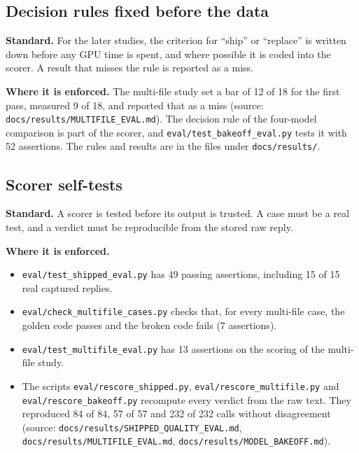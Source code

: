 \subsection{Decision rules fixed before the data}

\textbf{Standard.} For the later studies, the criterion for ``ship'' or ``replace'' is written down before any GPU time is spent, and where possible it is coded into the scorer. A result that misses the rule is reported as a miss.

\textbf{Where it is enforced.} The multi-file study set a bar of 12 of 18 for the first pass, measured 9 of 18, and reported that as a miss (source: \texttt{docs/\allowbreak{}results/\allowbreak{}MULTIFILE\_\allowbreak{}EVAL.md}). The decision rule of the four-model comparison is part of the scorer, and \texttt{eval/\allowbreak{}test\_\allowbreak{}bakeoff\_\allowbreak{}eval.py} tests it with 52 assertions. The rules and results are in the files under \texttt{docs/\allowbreak{}results/\allowbreak{}}.

\subsection{Scorer self-tests}

\textbf{Standard.} A scorer is tested before its output is trusted. A case must be a real test, and a verdict must be reproducible from the stored raw reply.

\textbf{Where it is enforced.}
\begin{itemize}
  \item \texttt{eval/\allowbreak{}test\_\allowbreak{}shipped\_\allowbreak{}eval.py} has 49 passing assertions, including 15 of 15 real captured replies.
  \item \texttt{eval/\allowbreak{}check\_\allowbreak{}multifile\_\allowbreak{}cases.py} checks that, for every multi-file case, the golden code passes and the broken code fails (7 assertions).
  \item \texttt{eval/\allowbreak{}test\_\allowbreak{}multifile\_\allowbreak{}eval.py} has 13 assertions on the scoring of the multi-file study.
  \item The scripts \texttt{eval/\allowbreak{}rescore\_\allowbreak{}shipped.py}, \texttt{eval/\allowbreak{}rescore\_\allowbreak{}multifile.py} and \texttt{eval/\allowbreak{}rescore\_\allowbreak{}bakeoff.py} recompute every verdict from the raw text. They reproduced 84 of 84, 57 of 57 and 232 of 232 calls without disagreement (source: \texttt{docs/\allowbreak{}results/\allowbreak{}SHIPPED\_\allowbreak{}QUALITY\_\allowbreak{}EVAL.md}, \texttt{docs/\allowbreak{}results/\allowbreak{}MULTIFILE\_\allowbreak{}EVAL.md}, \texttt{docs/\allowbreak{}results/\allowbreak{}MODEL\_\allowbreak{}BAKEOFF.md}).
\end{itemize}

